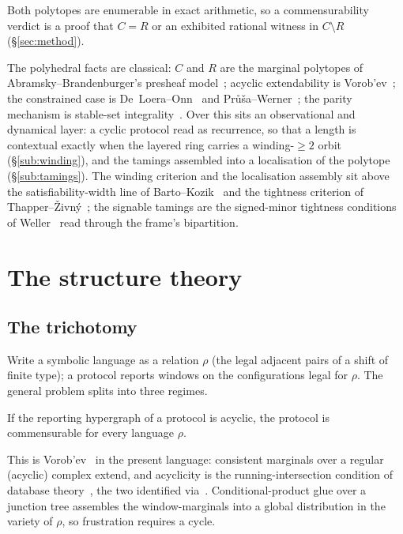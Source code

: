 Both polytopes are enumerable in exact arithmetic, so a commensurability verdict
is a proof that $C=R$ or an exhibited rational witness in $C\setminus R$
(\S\ref{sec:method}).

The polyhedral facts are classical: $C$ and $R$ are the marginal polytopes of
Abramsky--Brandenburger's presheaf model~\cite{AbramskyBrandenburger2011}; acyclic
extendability
is Vorob'ev~\cite{Vorobev1962}; the constrained case is
De~Loera--Onn~\cite{DeLoeraOnn2004} and
Pr\r{u}\v{s}a--Werner~\cite{PrusaWerner2015}; the parity mechanism is stable-set
integrality~\cite{NemhauserTrotter1974,Chvatal1975,HoffmanKruskal1956}. Over this
sits an observational and dynamical layer: a cyclic protocol read as recurrence,
so that a length is contextual exactly when the layered ring carries a
winding-$\ge2$ orbit (\S\ref{sub:winding}), and the tamings assembled into a
localisation of the polytope (\S\ref{sub:tamings}). The winding criterion and the
localisation assembly sit above the satisfiability-width line of
Barto--Kozik~\cite{BartoKozik2014} and the tightness criterion of
Thapper--\v{Z}ivn\'y~\cite{ThapperZivny2016}; the signable tamings are the
signed-minor tightness conditions of Weller~\cite{Weller2016,WellerRowlandSontag2016}
read through the frame's bipartition.


\section{The structure theory}\label{sec:structure}

\subsection{The trichotomy}\label{sub:trichotomy}

Write a symbolic language as a relation $\rho$ (the legal adjacent pairs of a shift
of finite type); a protocol reports windows on the configurations legal for
$\rho$. The general problem splits into three regimes.

\begin{theorem}\label{thm:acyclic}
If the reporting hypergraph of a protocol is acyclic, the protocol is
commensurable for every language $\rho$.
\end{theorem}

This is Vorob'ev~\cite{Vorobev1962} in the present language: consistent marginals
over a regular (acyclic) complex extend, and acyclicity is the running-intersection
condition of database theory~\cite{BeeriFaginMaierYannakakis1983}, the two
identified via~\cite{Abramsky2013}. Conditional-product glue over a junction tree
assembles the window-marginals into a global distribution in the variety of
$\rho$, so frustration requires a cycle.

